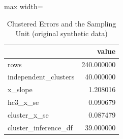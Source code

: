 \begin{table}[htbp]
\centering
\caption{Clustered Errors and the Sampling Unit (original synthetic data)}
\begingroup
\small
\setlength{\tabcolsep}{6pt}
\renewcommand{\arraystretch}{1.12}
\begin{adjustbox}{max width=\linewidth}
\begin{tabular}{@{}lr@{}}
\toprule
 & value \\
\midrule
rows & 240.000000 \\
independent\_clusters & 40.000000 \\
x\_slope & 1.208016 \\
hc3\_x\_se & 0.090679 \\
cluster\_x\_se & 0.087479 \\
cluster\_inference\_df & 39.000000 \\
\bottomrule
\end{tabular}
\end{adjustbox}
\endgroup
\end{table}